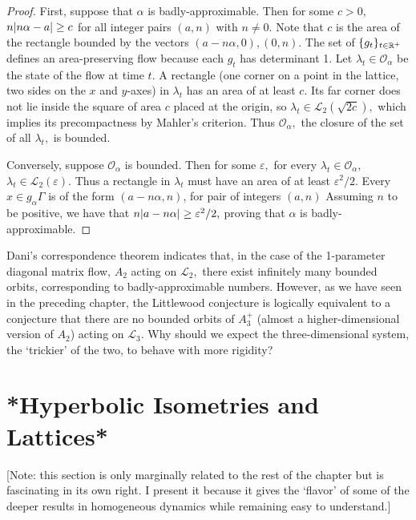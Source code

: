 \documentclass[12pt, letterpaper, oneside]{book}
\newcommand{\ga}{\ensuremath{\alpha}}
\renewcommand{\ge}{\ensuremath{\varepsilon}}
\newcommand{\gl}{\ensuremath{\lambda}}
\newcommand{\R}{\mathbb{R}}
\DeclarePairedDelimiter{\abs}{\lvert}{\rvert}
\DeclarePairedDelimiter{\set}{\lbrace}{\rbrace}
\theoremstyle{plain}
\theoremstyle{definition}
\theoremstyle{remark}
\begin{document}
\begin{proof}
First, suppose that $\ga$ is badly-approximable. Then for some $c >0,$ $n\abs{n\ga - a} \geq c$ for all integer pairs $(a,n)$ with $n \neq 0.$ Note that $c$ is the area of the rectangle bounded by the vectors $(a - n\ga, 0), (0, n).$ The set of $\set{g_t}_{t \in \R^+}$ defines an area-preserving flow because each $g_t$ has determinant 1. Let $ \gl_t \in \mathcal{O}_{\ga}$ be the state of the flow at time $t.$ A rectangle (one corner on a point in the lattice, two sides on the $x$ and $y$-axes) in $\gl_t$ has an area of at least $c.$ Its far corner does not lie inside the square of area $c$ placed at the origin, so $\gl_t \in \mathcal{L}_2(\sqrt{2c}),$ which implies its precompactness by Mahler's criterion. Thus $\mathcal{O}_{\ga},$ the closure of the set of all $\gl_t,$ is bounded.

Conversely, suppose $\mathcal{O}_{\ga}$ is bounded. Then for some $\ge,$ for every $\gl_t \in \mathcal{O}_\ga,$ $\gl_t \in \mathcal{L}_2(\ge).$ Thus a rectangle in $\gl_t$ must have an area of at least $\ge^2/2.$ Every $x \in g_\ga \Gamma$ is of the form $(a - n\ga, n)$, for pair of integers $(a,n)$  Assuming $n$ to be positive, we have that $n \abs{a - n\ga}  \geq \ge^2/2,$ proving that $\ga$ is badly-approximable.
\end{proof}

Dani's correspondence theorem indicates that, in the case of the 1-parameter diagonal matrix flow, $A_2$ acting on $\mathcal{L}_2,$ there exist infinitely many bounded orbits, corresponding to badly-approximable numbers. However, as we have seen in the preceding chapter, the Littlewood conjecture is logically equivalent to a conjecture that there are no bounded orbits of $A_3^+$ (almost a higher-dimensional version of $A_2$) acting on $\mathcal{L}_3.$ Why should we expect the three-dimensional system, the `trickier' of the two, to behave with more rigidity? 

\section{*Hyperbolic Isometries and Lattices*}

[Note: this section is only marginally related to the rest of the chapter but is fascinating in its own right. I present it because it gives the `flavor' of some of the deeper results in homogeneous dynamics while remaining easy to understand.]
\end{document}
